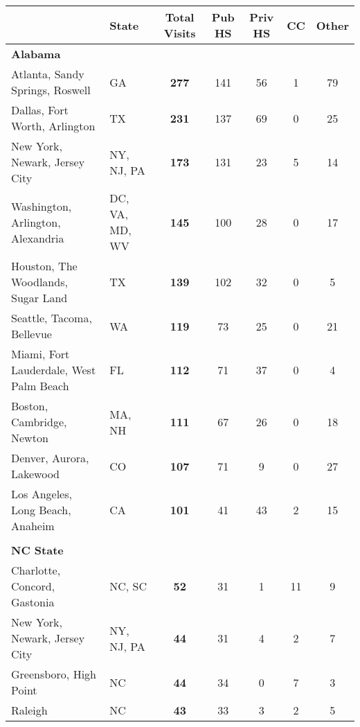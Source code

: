 \begin{tabular*}{\textwidth}{@{\extracolsep{\fill} } llccccc}%
\textbf{}&\textbf{State}&\textbf{Total Visits}&\textbf{Pub HS}&\textbf{Priv HS}&\textbf{CC}&\textbf{Other}\\%
\hline%
\multicolumn{7}{l}{\bfseries Alabama}\\%
\hspace{0.2cm}Atlanta, Sandy Springs, Roswell&GA&\bfseries 277&141&56&1&79\\%
\hspace{0.2cm}Dallas, Fort Worth, Arlington&TX&\bfseries 231&137&69&0&25\\%
\hspace{0.2cm}New York, Newark, Jersey City&NY, NJ, PA&\bfseries 173&131&23&5&14\\%
\hspace{0.2cm}Washington, Arlington, Alexandria&DC, VA, MD, WV&\bfseries 145&100&28&0&17\\%
\hspace{0.2cm}Houston, The Woodlands, Sugar Land&TX&\bfseries 139&102&32&0&5\\%
\hspace{0.2cm}Seattle, Tacoma, Bellevue&WA&\bfseries 119&73&25&0&21\\%
\hspace{0.2cm}Miami, Fort Lauderdale, West Palm Beach&FL&\bfseries 112&71&37&0&4\\%
\hspace{0.2cm}Boston, Cambridge, Newton&MA, NH&\bfseries 111&67&26&0&18\\%
\hspace{0.2cm}Denver, Aurora, Lakewood&CO&\bfseries 107&71&9&0&27\\%
\hspace{0.2cm}Los Angeles, Long Beach, Anaheim&CA&\bfseries 101&41&43&2&15\\%
&&&&&&\\%
\multicolumn{7}{l}{\bfseries NC State}\\%
\hspace{0.2cm}Charlotte, Concord, Gastonia&NC, SC&\bfseries 52&31&1&11&9\\%
\hspace{0.2cm}New York, Newark, Jersey City&NY, NJ, PA&\bfseries 44&31&4&2&7\\%
\hspace{0.2cm}Greensboro, High Point&NC&\bfseries 44&34&0&7&3\\%
\hspace{0.2cm}Raleigh&NC&\bfseries 43&33&3&2&5\\%

\end{tabular*}
